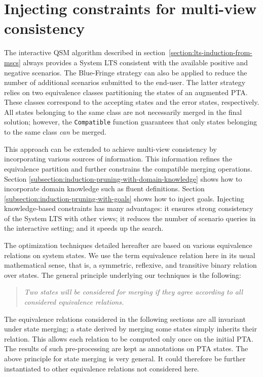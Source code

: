 \section{Injecting constraints for multi-view consistency\label{section:inductive-mutliview-consistency}}

The interactive QSM algorithm described in section~\ref{section:lts-induction-from-mscs} always provides a System LTS consistent with the available positive and negative scenarios. The Blue-Fringe strategy can also be applied to reduce the number of additional scenarios submitted to the end-user. The latter strategy relies on two equivalence classes partitioning the states of an augmented PTA. These classes correspond to the accepting states and the error states, respectively. All states belonging to the same class are not necessarily merged in the final solution; however, the \texttt{Compatible} function guarantees that only states belonging to the same class \emph{can} be merged.

This approach can be extended to achieve multi-view consistency by incorporating various sources of information. This information refines the equivalence partition and further constrains the compatible merging operations. Section \ref{subsection:induction-pruning-with-domain-knowledge} shows how to incorporate domain knowledge such as fluent definitions. Section \ref{subsection:induction-pruning-with-goals} shows how to inject goals. Injecting knowledge-based constraints has many advantages: it ensures strong consistency of the System LTS with other views; it reduces the number of scenario queries in the interactive setting; and it speeds up the search.

The optimization techniques detailed hereafter are based on various equivalence relations on system states. We use the term equivalence relation here in its usual mathematical sense, that is, a symmetric, reflexive, and transitive binary relation over states. The general principle underlying our techniques is the following:
\begin{quote}
\emph{Two states will be considered for merging if they agree according to all considered equivalence relations.}
\end{quote}
The equivalence relations considered in the following sections are all invariant under state merging; a state derived by merging some states simply inherits their relation. This allows each relation to be computed only once on the initial PTA. The results of such pre-processing are kept as annotations on PTA states. The above principle for state merging is very general. It could therefore be further instantiated to other equivalence relations not considered here.

